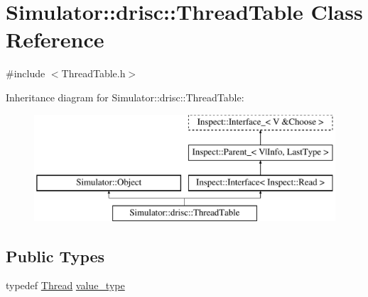 \hypertarget{class_simulator_1_1drisc_1_1_thread_table}{\section{Simulator\+:\+:drisc\+:\+:Thread\+Table Class Reference}
\label{class_simulator_1_1drisc_1_1_thread_table}
}


{\ttfamily \#include $<$Thread\+Table.\+h$>$}

Inheritance diagram for Simulator\+:\+:drisc\+:\+:Thread\+Table\+:\begin{figure}[H]
\begin{center}
\leavevmode
\includegraphics[height=4.000000cm]{class_simulator_1_1drisc_1_1_thread_table}
\end{center}
\end{figure}
\subsection*{Public Types}
\begin{DoxyCompactItemize}
\item 
typedef \hyperlink{struct_simulator_1_1drisc_1_1_thread}{Thread} \hyperlink{class_simulator_1_1drisc_1_1_thread_table_a56eae29ce678ae87c43ddd725f48d392}{value\+\_\+type}
\end{DoxyCompactItemize}
